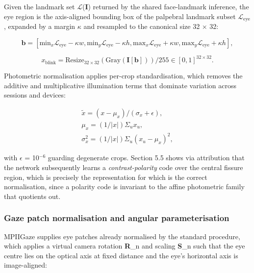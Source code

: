Given the landmark set $\mathcal{L}$(\textbf{I}) returned by the shared face-landmark inference, the eye region is the axis-aligned bounding box of the palpebral landmark subset $\mathcal{L}_{\mathrm{eye}}$, expanded by a margin $\kappa$ and resampled to the canonical size 32 $\times$ 32:

\begin{equation}
\label{eq:13}
\mathbf{b} = [ \mathrm{min}_x \mathcal{L}_{\mathrm{eye}} - \kappa w, \mathrm{min}_y \mathcal{L}_{\mathrm{eye}} - \kappa h, \mathrm{max}_x \mathcal{L}_{\mathrm{eye}} + \kappa w, \mathrm{max}_y \mathcal{L}_{\mathrm{eye}} + \kappa h ],
\end{equation}

\begin{equation}
\label{eq:14}
x_{\mathrm{blink}} = \mathrm{Resize}_{32\times 32} ( \mathrm{Gray} ( \mathbf{I} [ \mathbf{b} ] ) ) / 255 \in [0,1]^{32\times 32}.
\end{equation}

Photometric normalisation applies per-crop standardisation, which removes the additive and multiplicative illumination terms that dominate variation across sessions and devices:

\begin{equation}
\label{eq:15}
\begin{aligned}
\tilde{x} = ( x - \mu _x ) / ( \sigma _x + \epsilon ), \\
\mu _x = (1/|x|) \Sigma _{u} x_u, \\
\sigma _x^{2} = (1/|x|) \Sigma _{u} (x_u - \mu _x)^{2},
\end{aligned}
\end{equation}

with $\epsilon$ = 10$^{-6}$ guarding degenerate crops. Section 5.5 shows via attribution that the network subsequently learns a \emph{contrast-polarity} code over the central fissure region, which is precisely the representation for which  is the correct normalisation, since a polarity code is invariant to the affine photometric family that  quotients out.

\subsubsection{Gaze patch normalisation and angular parameterisation}

MPIIGaze supplies eye patches already normalised by the standard procedure, which applies a virtual camera rotation \textbf{R}\_n and scaling \textbf{S}\_n such that the eye centre lies on the optical axis at fixed distance and the eye's horizontal axis is image-aligned:

